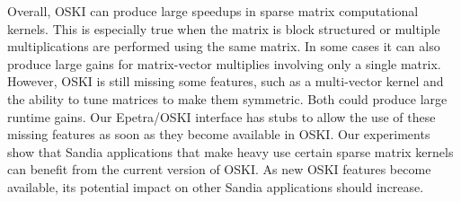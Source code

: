 Overall, OSKI can produce large speedups in sparse matrix computational kernels.  This is especially
true
when the matrix is block structured or multiple multiplications are performed
using the same matrix.  In some cases it can also produce large gains for matrix-vector
multiplies involving only a single matrix.  However, OSKI is still
missing some features, such as a multi-vector kernel and the ability to tune
matrices to make them symmetric. Both could produce large runtime gains.  Our Epetra/OSKI
interface has stubs to allow the use of these missing features as soon as they become available in
OSKI.  Our experiments show that Sandia applications that make heavy use certain sparse matrix kernels
can benefit from the current version of OSKI.  As new OSKI features 
become available, its potential impact on other Sandia applications should increase.
